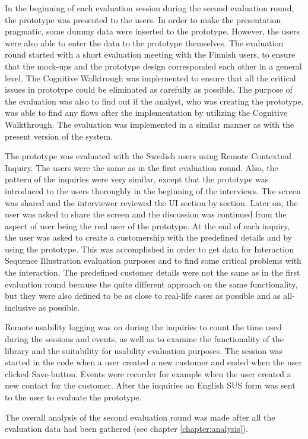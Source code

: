 \documentclass[12pt,a4paper,oneside,pdftex]{report}
\begin{document}
In the beginning of each evaluation session during the second evaluation round, the prototype was presented to the users. In order to make the presentation pragmatic, some dummy data were inserted to the prototype. However, the users were also able to enter the data to the prototype themselves. The evaluation round started with a short evaluation meeting with the Finnish users, to ensure that the mock-ups and the prototype design corresponded each other in a general level. The Cognitive Walktrough was implemented to ensure that all the critical issues in prototype could be eliminated as carefully as possible. The purpose of the evaluation was also to find out if the analyst, who was creating the prototype, was able to find any flaws after the implementation by utilizing the Cognitive Walkthrough. The evaluation was implemented in a similar manner as with the present version of the system. 

The prototype was evaluated with the Swedish users using Remote Contextual Inquiry. The users were the same as in the first evaluation round. Also, the pattern of the inquiries were very similar, except that the prototype was introduced to the users thoroughly in the beginning of the interviews. The screen was shared and the interviewer reviewed the UI section by section. Later on, the user was asked to share the screen and the discussion was continued from the aspect of user being the real user of the prototype. At the end of each inquiry, the user was asked to create a customership with the predefined details and by using the prototype. This was accomplished in order to get data for Interaction Sequence Illustration evaluation purposes and to find some critical problems with the interaction. The predefined customer details were not the same as in the first evaluation round because the quite different approach on the same functionality, but they were also defined to be as close to real-life cases as possible and as all-inclusive as possible. 

Remote usability logging was on during the inquiries to count the time used during the sessions and events, as well as to examine the functionality of the library and the suitability for usability evaluation purposes. The session was started in the code when a user created a new customer and ended when the user clicked Save-button. Events were recorder for example when the user created a new contact for the customer. After the inquiries an English SUS form was sent to the user to evaluate the prototype.

The overall analysis of the second evaluation round was made after all the evaluation data had been gathered  (see chapter \ref{chapter:analysis}). 
    	
\end{document}

